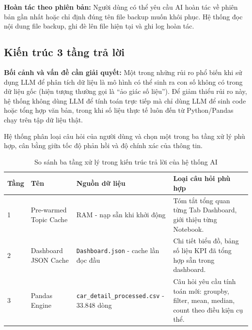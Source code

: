 \noindent\textbf{Hoàn tác theo phiên bản:}
Người dùng có thể yêu cầu AI hoàn tác về phiên bản gần nhất hoặc chỉ định đúng tên file backup muốn khôi phục. Hệ thống đọc nội dung file backup, ghi đè lên file hiện tại và ghi log hoàn tác.

\subsection{Kiến trúc 3 tầng trả lời}
\label{subsec:ai_3tier}

\noindent\textbf{Bối cảnh và vấn đề cần giải quyết:}
Một trong những rủi ro phổ biến khi sử dụng LLM để phân tích dữ liệu là mô hình có thể sinh ra con số không có trong dữ liệu gốc (hiện tượng thường gọi là ``ảo giác số liệu''). Để giảm thiểu rủi ro này, hệ thống không dùng LLM để tính toán trực tiếp mà chỉ dùng LLM để sinh code hoặc tổng hợp văn bản, trong khi số liệu thực tế luôn đến từ Python/Pandas chạy trên tập dữ liệu thật.

Hệ thống phân loại câu hỏi của người dùng và chọn một trong ba tầng xử lý phù hợp, cân bằng giữa tốc độ phản hồi và độ chính xác của thông tin.

\begin{table}[H]
\centering
\small
\begin{tabularx}{\textwidth}{L{1.5cm} L{3.5cm} L{3.5cm} Y}
\textbf{Tầng} & \textbf{Tên} & \textbf{Nguồn dữ liệu} & \textbf{Loại câu hỏi phù hợp} \\  & Pre-warmed Topic Cache & RAM - nạp sẵn khi khởi động & Tóm tắt tổng quan từng Tab Dashboard, giới thiệu từng Notebook. \\
2 & Dashboard JSON Cache & \texttt{Dashboard.json} - cache lần đọc đầu & Chi tiết biểu đồ, bảng số liệu KPI đã tổng hợp sẵn trong dashboard. \\
3 & Pandas Engine & \texttt{car\_detail\_\allowbreak processed.\allowbreak csv} - 33.848 dòng & Câu hỏi yêu cầu tính toán mới: groupby, filter, mean, median, count theo điều kiện cụ thể. \\
\end{tabularx}
\caption{So sánh ba tầng xử lý trong kiến trúc trả lời của hệ thống AI}
\label{tab:3tier_overview}
\end{table}

